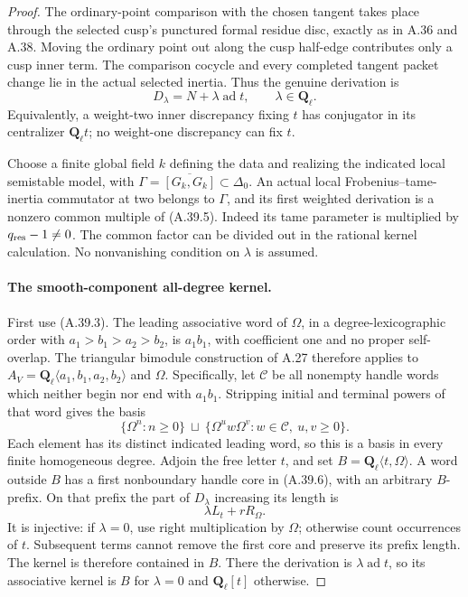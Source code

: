 \begin{proof}
The ordinary-point comparison with the chosen
tangent takes place through the selected cusp's
punctured formal residue disc, exactly as in A.36
and A.38. Moving the ordinary point out along the
cusp half-edge contributes only a cusp inner term.
The comparison cocycle and every completed tangent
packet change lie in the actual selected inertia.
Thus the genuine derivation is
\[
                         D_\lambda=N+\lambda\operatorname{ad}t,
                   \qquad\lambda\in\mathbf Q_\ell.   \tag{A.39.5}
\]
Equivalently, a weight-two inner discrepancy fixing
\(t\) has conjugator in its centralizer
\(\mathbf Q_\ell t\); no weight-one discrepancy
can fix \(t\).

Choose a finite global field \(k\) defining the data
and realizing the indicated local semistable model,
with \(\Gamma=\overline{[G_k,G_k]}\subset\Delta_0\).
An actual local Frobenius--tame-inertia commutator
at two belongs to \(\Gamma\), and its first weighted
derivation is a nonzero common multiple of (A.39.5).
Indeed its tame parameter is multiplied by
\(q_{\rm res}-1\ne0\). The common factor can be
divided out in the rational kernel calculation.
No nonvanishing condition on \(\lambda\) is assumed.

\paragraph{The smooth-component all-degree kernel.}
First use (A.39.3). The leading associative word of
\(\Omega\), in a degree-lexicographic order with
\(a_1>b_1>a_2>b_2\), is \(a_1b_1\), with coefficient
one and no proper self-overlap. The triangular
bimodule construction of A.27 therefore applies to
\(A_V=\mathbf Q_\ell\langle a_1,b_1,a_2,b_2\rangle\)
and \(\Omega\). Specifically, let \(\mathcal C\)
be all nonempty handle words which neither begin
nor end with \(a_1b_1\). Stripping initial and
terminal powers of that word gives the basis
\[
 \{\Omega^n:n\ge0\}\ \sqcup\
 \{\Omega^u w\Omega^v:w\in\mathcal C,\ u,v\ge0\}.
                                                               \tag{A.39.6}
\]
Each element has its distinct indicated leading
word, so this is a basis in every finite homogeneous
degree. Adjoin the free letter \(t\), and set
\(B=\mathbf Q_\ell\langle t,\Omega\rangle\).
A word outside \(B\) has a first nonboundary handle
core in (A.39.6), with an arbitrary \(B\)-prefix.
On that prefix the part of \(D_\lambda\) increasing
its length is
\[
                          \lambda L_t+rR_\Omega.
                                                               \tag{A.39.7}
\]
It is injective: if \(\lambda=0\), use right
multiplication by \(\Omega\); otherwise count
occurrences of \(t\). Subsequent terms cannot
remove the first core and preserve its prefix
length. The kernel is therefore contained in
\(B\). There the derivation is
\(\lambda\operatorname{ad}t\), so its associative
kernel is \(B\) for \(\lambda=0\) and
\(\mathbf Q_\ell[t]\) otherwise.


\end{proof}
